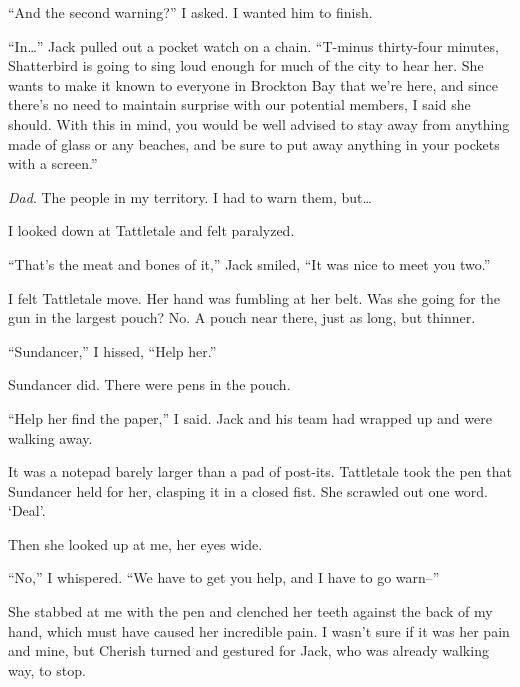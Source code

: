 ``And the second warning?'' I asked.  I wanted him to finish.



``In\ldots'' Jack pulled out a pocket watch on a chain. ``T-minus thirty-four minutes, Shatterbird is going to sing loud enough for much of the city to hear her.  She wants to make it known to everyone in Brockton Bay that we're here, and since there's no need to maintain surprise with our potential members, I said she should.  With this in mind, you would be well advised to stay away from anything made of glass or any beaches, and be sure to put away anything in your pockets with a screen.''



\emph{Dad}.  The people in my territory.  I had to warn them, but\ldots



I looked down at Tattletale and felt paralyzed.



``That's the meat and bones of it,'' Jack smiled, ``It was nice to meet you two.''



I felt Tattletale move.  Her hand was fumbling at her belt.  Was she going for the gun in the largest pouch?  No.  A pouch near there, just as long, but thinner.



``Sundancer,'' I hissed, ``Help her.''



Sundancer did.  There were pens in the pouch.



``Help her find the paper,'' I said.  Jack and his team had wrapped up and were walking away.



It was a notepad barely larger than a pad of post-its.  Tattletale took the pen that Sundancer held for her, clasping it in a closed fist.  She scrawled out one word.  `Deal'.



Then she looked up at me, her eyes wide.



``No,'' I whispered.  ``We have to get you help, and I have to go warn--''



She stabbed at me with the pen and clenched her teeth against the back of my hand, which must have caused her incredible pain.  I wasn't sure if it was her pain and mine, but Cherish turned and gestured for Jack, who was already walking way, to stop.



